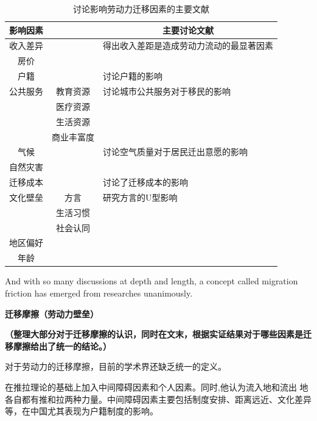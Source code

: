 \documentclass[a4paper,12pt,oneside]{book} %
\begin{document}
\begin{table}[!ht]
\centering
\begin{tabularx}{\textwidth}{@{}ccX@{}}
\toprule
\textbf{影响因素} &  & \multicolumn{1}{c}{\textbf{主要讨论文献}} \\ 
\midrule
收入差异 &  &  \cite{kennanEffectExpectedIncome2011}得出收入差距是造成劳动力流动的最显著因素\\
房价 &  &  \cite{ZhangLiFangJieRuHeYingXiangLaoDongLiLiuDong2017}\\
户籍 &  & \cite{ngaiChinasMobilityBarriers2019}讨论户籍的影响 \\
公共服务 &  教育资源&  \cite{XiaYiRanChengShiJianDeMengMuSanQianGongGongFuWuYingXiangLaoDongLiLiuXiangDeJingYanYanJiu2015}讨论城市公共服务对于移民的影响\\
  & 医疗资源 & \\
  & 生活资源 & \\
  & 商业丰富度 & \\
气候 &  &  \cite{HongDaYongDiWeiChaiYiGuaYingXingYuJiXiaoQiDaiKongQiWuRanYouZhiDeJuMinQianChuYiXiangFenYiYanJiu2016}讨论空气质量对于居民迁出意愿的影响\\
自然灾害 &  &  \\
迁移成本 &  &  \cite{WangLiLiWoGuoRenKouQianYiChengBenChengShiGuiMoYuShengChanLu2020}讨论了迁移成本的影响\\
文化壁垒 & 方言 &  \cite{LiuYuYunLaoDongLiKuaFangYanLiuDongDeDaoUXingMoShi2015}研究方言的U型影响\\
  & 生活习惯 &  \\
  & 社会认同 &  \\
地区偏好 &  &  \\ 
年龄 & & \\
\bottomrule
\end{tabularx}
\caption{讨论影响劳动力迁移因素的主要文献}
\label{tab:影响劳动力迁移的因素}
\end{table}



And with so many discussions at depth and length, a concept called migration friction has emerged from researches unanimously. 


\textbf{迁移摩擦（劳动力壁垒）}

\textbf{（整理大部分对于迁移摩擦的认识，同时在文末，根据实证结果对于哪些因素是迁移摩擦给出了统一的结论。）}

对于劳动力的迁移摩擦，目前的学术界还缺乏统一的定义。

\cite{leeTheoryMigration1966}在推拉理论的基础上加入中间障碍因素和个人因素。同时,他认为流入地和流出  地各自都有推和拉两种力量。中间障碍因素主要包括制度安排、距离远近、文化差异等，在中国尤其表现为户籍制度的影响。
\end{document}
